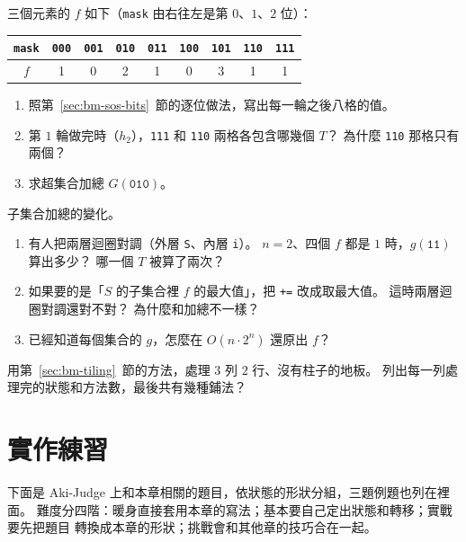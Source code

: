 \begin{drills}[label=drills:bm]
\item 三個元素的 $f$ 如下（\texttt{mask} 由右往左是第 $0$、$1$、$2$ 位）：
\begin{center}
\begin{tabular}{c|cccccccc}
\toprule
\texttt{mask} & \texttt{000} & \texttt{001} & \texttt{010} & \texttt{011} & \texttt{100} & \texttt{101} & \texttt{110} & \texttt{111} \\
\midrule
$f$ & 1 & 0 & 2 & 1 & 0 & 3 & 1 & 1 \\
\bottomrule
\end{tabular}
\end{center}
\begin{enumerate}
\item 照第~\ref{sec:bm-sos-bits}~節的逐位做法，寫出每一輪之後八格的值。
\item 第 $1$ 輪做完時（$h_2$），\texttt{111} 和 \texttt{110} 兩格各包含哪幾個
$T$？ 為什麼 \texttt{110} 那格只有兩個？
\item 求超集合加總 $G(\texttt{010})$。
\end{enumerate}

\item 子集合加總的變化。
\begin{enumerate}
\item 有人把兩層迴圈對調（外層 \texttt{S}、內層 \texttt{i}）。 $n = 2$、四個
$f$ 都是 $1$ 時，$g(\texttt{11})$ 算出多少？ 哪一個 $T$ 被算了兩次？
\item 如果要的是「$S$ 的子集合裡 $f$ 的最大值」，把 \texttt{+=} 改成取最大值。
這時兩層迴圈對調還對不對？ 為什麼和加總不一樣？
\item 已經知道每個集合的 $g$，怎麼在 $O(n \cdot 2^n)$ 還原出 $f$？
\end{enumerate}

\item 用第~\ref{sec:bm-tiling}~節的方法，處理 $3$ 列 $2$ 行、沒有柱子的地板。
列出每一列處理完的狀態和方法數，最後共有幾種鋪法？
\end{drills}

\section{實作練習}
\label{sec:bm-practice}

下面是 Aki-Judge 上和本章相關的題目，依狀態的形狀分組，三題例題也列在裡面。
難度分四階：暖身直接套用本章的寫法；基本要自己定出狀態和轉移；實戰要先把題目
轉換成本章的形狀；挑戰會和其他章的技巧合在一起。

